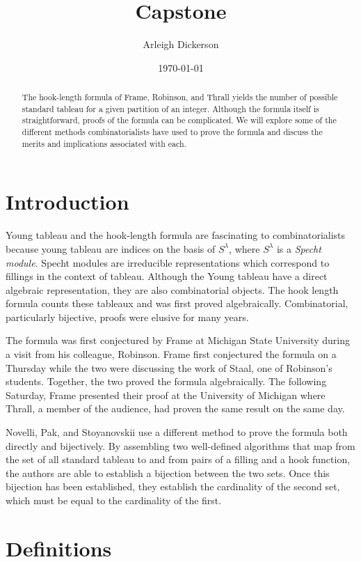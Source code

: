 \documentclass[11pt]{article}
\title{Capstone}
\author{Arleigh Dickerson}
\date{\today}
\theoremstyle{definition}
\begin{document}
\maketitle

\begin{abstract}
The hook-length formula of Frame, Robinson, and Thrall yields the number of possible standard tableau for a given partition of an integer. Although the formula itself is straightforward, proofs of the formula can be complicated. We will explore some of the different methods combinatorialists have used to prove the formula and discuss the merits and implications associated with each. 
\end{abstract}

\section{Introduction}
Young tableau and the hook-length formula are fascinating to combinatorialists because young tableau are indices on the basis of $S^\lambda$, where $S^\lambda$ is a \emph{Specht module}. Specht modules are irreducible representations which correspond to fillings in the context of tableau. Although the Young tableau have a direct algebraic representation, they are also combinatorial objects. The hook length formula counts these tableaux and was first proved algebraically. Combinatorial, particularly bijective, proofs were elusive for many years.

The formula was first conjectured by Frame at Michigan State University during a visit from his colleague, Robinson. Frame first conjectured the formula on a Thursday while the two were discussing the work of Staal, one of Robinson's students. Together, the two proved the formula algebraically. The following Saturday, Frame presented their proof at the University of Michigan where Thrall, a member of the audience, had proven the same result on the same day.

Novelli, Pak, and Stoyanovskii use a different method to prove the formula both directly and bijectively. By assembling two well-defined algorithms that map from the set of all standard tableau to and from pairs of a filling and a hook function, the authors are able to establish a bijection between the two sets. Once this bijection has been established, they establish the cardinality of the second set, which must be equal to the cardinality of the first.

\section{Definitions}
\end{document}
